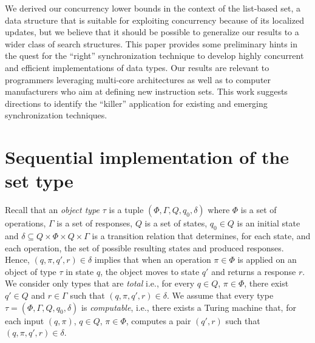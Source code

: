 \documentclass[11pt,pdftex,letterpaper]{article}
\begin{document}
We derived our concurrency lower bounds in the context of the list-based set, a data structure
that is suitable for exploiting concurrency because of its localized
updates, but we believe that it should be possible to generalize our results to a wider class of search structures. 
This paper provides some preliminary hints in the quest for 
the ``right'' synchronization technique to develop highly concurrent and efficient implementations of data 
types.
Our results are relevant to programmers leveraging
multi-core architectures as well as to computer manufacturers 
who aim at defining new instruction sets.
This work suggests directions to identify the ``killer'' application
for existing and emerging synchronization techniques.
 
\newpage


\appendix
\section{Sequential implementation of the set type}
\label{app:seq}
Recall that an \emph{object type} $\tau$ is a tuple
$(\Phi,\Gamma, Q, q_0, \delta)$ where
$\Phi$ is a set of operations,
$\Gamma$ is a set of responses, $Q$ is a set of states, $q_0\in Q$ is an
initial state and 
$\delta \subseteq Q\times \Phi \times Q\times \Gamma$ 
is a transition relation that determines, for each state,
and each operation, the set of possible
resulting states and  produced responses. 
Hence, $(q,\pi,q',r) \in \delta$ implies that when
an operation $\pi \in \Phi$ is applied on an object of type $\tau$
in state $q$, the object moves to state $q'$ and returns a response $r$.
We consider only types that are \emph{total}
 i.e., for every $q\in Q$,
$\pi \in \Phi$, there exist  $q' \in Q$ and
$r\in \Gamma$ such that $(q,\pi,q',r) \in \delta$.
We assume that every type $\tau=(\Phi,\Gamma, Q, q_0, \delta)$ is \emph{computable}, i.e., 
there exists a Turing machine that, 
for each input $(q,\pi)$, $q \in Q$, $\pi\in \Phi$, computes
a pair $(q',r)$ such that $(q,\pi,q',r) \in \delta$.
\end{document}
